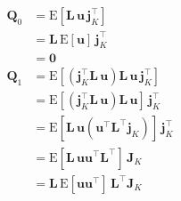 \documentclass[modern]{aastex62}
\begin{document}
\begin{align}
    \mathbf{Q}_0 & = \mathrm{E}\left[ \mathbf{L} \, \mathbf{u} \, \mathbf{j}_K^\top \right]
    \nonumber                                                                                                                                                                            \\
                 & = \mathbf{L} \, \mathrm{E}\left[  \mathbf{u} \right] \, \mathbf{j}_K^\top
    \nonumber                                                                                                                                                                            \\
                 & = \mathbf{0}
    \\[1em]
    \mathbf{Q}_1 & = \mathrm{E}\left[ \left(\mathbf{j}_K^\top \mathbf{L} \, \mathbf{u}\right) \mathbf{L} \, \mathbf{u} \, \mathbf{j}_K^\top \right]
    \nonumber                                                                                                                                                                            \\
                 & = \mathrm{E}\left[ \left(\mathbf{j}_K^\top \mathbf{L} \, \mathbf{u}\right) \mathbf{L} \, \mathbf{u} \right] \, \mathbf{j}_K^\top
    \nonumber                                                                                                                                                                            \\
                 & = \mathrm{E}\left[ \mathbf{L} \, \mathbf{u} (\mathbf{u}^\top \mathbf{L}^\top \mathbf{j}_K) \right] \, \mathbf{j}_K^\top
    \nonumber                                                                                                                                                                            \\
                 & = \mathrm{E}\left[ \mathbf{L} \, \mathbf{u} \mathbf{u}^\top \mathbf{L}^\top  \right] \, \mathbf{J}_K
    \nonumber                                                                                                                                                                            \\
                 & = \mathbf{L} \, \mathrm{E}\left[  \mathbf{u} \mathbf{u}^\top   \right]  \, \mathbf{L}^\top \mathbf{J}_K
    \nonumber                                                                                                                                                                            \\

\end{align}
\end{document}
